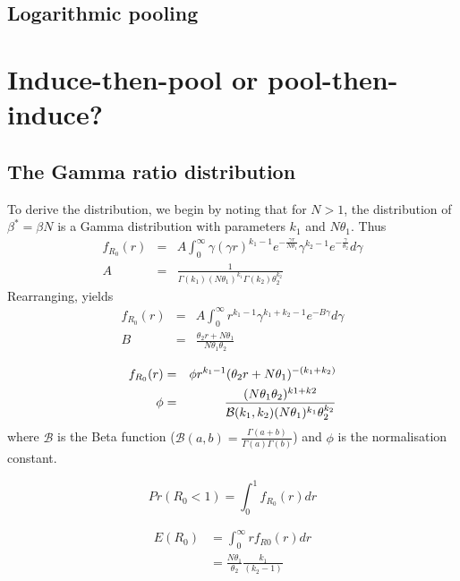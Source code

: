 \documentclass[a4paper, notitlepage, 10pt]{article}
\begin{document}
\subsection{Logarithmic pooling} 


\section{Induce-then-pool or pool-then-induce?}


\subsection{The Gamma ratio distribution}

To derive the distribution, we begin by noting that for $N > 1$, the distribution of $\beta^{\ast} = \beta N$ is a Gamma distribution with parameters $k_1$ and $N\theta_1$.
Thus
\begin{eqnarray}
f_{R_0}(r) &=& A \int_{0}^{\infty} \gamma(\gamma r)^{k_1 -1} e^{-\frac{\gamma r}{N\theta_1}} \gamma^{k_2 -1} e^{-\frac{\gamma}{\theta_2}} d\gamma \\
A &=& \frac{1}{\Gamma(k_1)(N\theta_1)^{k_1}\Gamma(k_2)\theta_2^{k_2}}
\end{eqnarray}
Rearranging, yields
\begin{eqnarray}
\label{eq:toint}
f_{R_0}(r) &=& A \int_{0}^{\infty} r^{k_1 -1} \gamma^{k_1 + k_2 -1} e^{-B\gamma} d\gamma \\
        B  &=& \frac{\theta_2 r + N\theta_1}{N\theta_1\theta_2}
\end{eqnarray}


\begin{eqnarray}
\label{eq:density}
f_{R_0}(r) &=& \phi\space r^{k_1-1} (\theta_2 r + N\theta_1)^{-(k_1 + k_2)} \\
\label{eq:normconst}
\phi &=&  \frac{(N\theta_1\theta_2)^{k1+k2}}{\mathcal{B}(k_1, k_2)(N\theta_1)^{k_1}\theta_2^{k_2} }
\end{eqnarray}
where $\mathcal{B}$ is the Beta function ($\mathcal{B}(a, b) = \frac{\Gamma(a + b)}{\Gamma(a)\Gamma(b)}$) and $\phi$ is the normalisation constant.

\begin{equation}
\label{eq:prR01}
Pr(R_0 < 1) = \int_{0}^{1} f_{R_0}(r)dr 
\end{equation}

\begin{align}
\label{eq:expR0}
E(R_0) &= \int_{0}^{\infty}rf_{R0}(r)dr \\
       &= \frac{N\theta_1}{\theta_2}\frac{k_1}{(k_2-1)}
\end{align}
\end{document}
